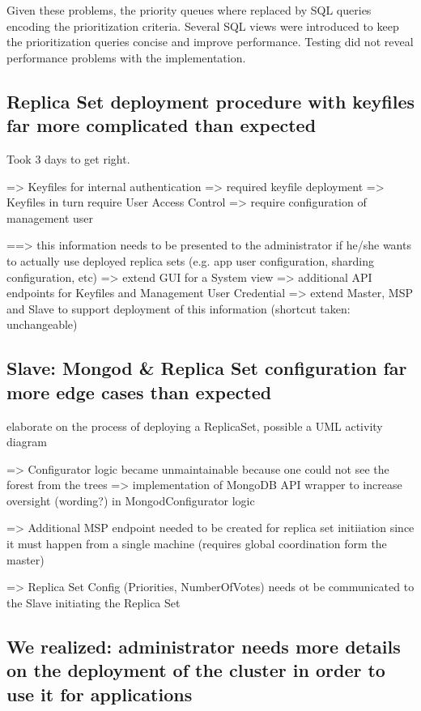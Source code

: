 Given these problems, the priority queues where replaced by SQL queries encoding the prioritization criteria.
Several SQL views were introduced to keep the prioritization queries concise and improve performance.
Testing did not reveal performance problems with the  implementation.

\subsection{Replica Set deployment procedure with keyfiles far more complicated than expected}

Took 3 days to get right.

=> Keyfiles for internal authentication => required keyfile deployment
=> Keyfiles in turn require User Access Control  => require configuration of management user

==> this information needs to be presented to the administrator if he/she wants to actually use deployed replica sets
    (e.g. app user configuration, sharding configuration, etc)
    => extend GUI for a System view
      => additional API endpoints for Keyfiles and Management User Credential
    => extend Master, MSP and Slave to support deployment of this information
       (shortcut taken: unchangeable)

\subsection{Slave: Mongod \& Replica Set configuration far more edge cases than expected}

elaborate on the process of deploying a ReplicaSet, possible a UML activity diagram

=> Configurator logic became unmaintainable because one could not see the forest from the trees
  => implementation of MongoDB API wrapper to increase oversight (wording?) in MongodConfigurator logic

=> Additional MSP endpoint needed to be created for replica set initiiation since it must happen from a single machine
   (requires global coordination form the master)

  => Replica Set Config (Priorities, NumberOfVotes) needs ot be communicated to the Slave initiating the Replica Set


\subsection{We realized: administrator needs more details on the deployment of the cluster in order to use it for applications}

